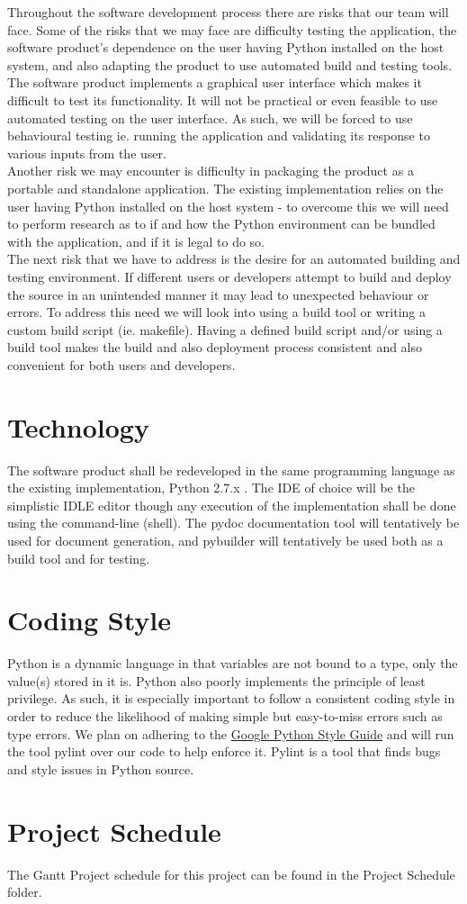 \documentclass{article}
\begin{document}
\noindent Throughout the software development process there are risks that our
team will face. Some of the risks that we may face are difficulty testing the
application, the software product's dependence on the user having Python
installed on the host system, and also adapting the product to use automated
build and testing tools.\\The software product implements a graphical user
interface which makes it difficult to test its functionality. It will not be
practical or even feasible to use automated testing on the user interface. As
such, we will be forced to use behavioural testing ie. running the application
and validating its response to various inputs from the user. \\Another risk we
may encounter is difficulty in packaging the product as a portable and
standalone application. The existing implementation relies on the user having
Python installed on the host system - to overcome this we will need to perform
research as to if and how the Python environment can be bundled with the
application, and if it is legal to do so.\\The next risk that we have to address
is the desire for an automated building and testing environment. If different
users or developers attempt to build and deploy the source in an unintended
manner it may lead to unexpected behaviour or errors. To address this need we
will look into using a build tool or writing a custom build script (ie.
makefile). Having a defined build script and/or using a build tool makes the
build and also deployment process consistent and also convenient for both users
and developers.


\section{Technology} \noindent The software product shall be redeveloped in the
same programming language as the existing implementation, Python 2.7.x . The IDE
of choice will be the simplistic IDLE editor though any execution of the
implementation shall be done using the command-line (shell). The pydoc
documentation tool will tentatively be used for document generation, and
pybuilder will tentatively be used both as a build tool and for testing.

\section{Coding Style} 

\noindent Python is a dynamic language in that variables are not bound to a
type, only the value(s) stored in it is. Python also poorly implements the
principle of least privilege. As such, it is especially important to follow a
consistent coding style in order to reduce the likelihood of making simple but
easy-to-miss errors such as type errors. We plan on adhering to the
\href{https://google.github.io/styleguide/pyguide.html}
{Google Python Style Guide} and will run the tool pylint over our code to help
enforce it. Pylint is a tool that finds bugs and style issues in Python source.

\section{Project Schedule} 

\noindent The Gantt Project schedule for this project can be found in the
Project Schedule folder.
\end{document}
